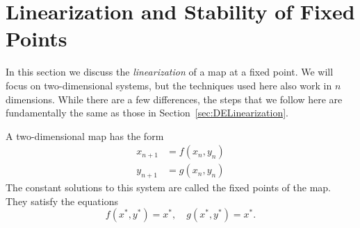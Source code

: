 \section{Linearization and Stability of Fixed Points}
%
In this section we discuss the \emph{linearization}
of a map at a fixed point. 
We will focus on two-dimensional systems, but the
techniques used here also work in $n$ dimensions.
While there are a few differences, the steps that
we follow here are fundamentally the same as those
in Section~\ref{sec:DELinearization}.

A two-dimensional map has the form
\begin{equation}
\begin{split}
  x_{n+1} & = f(x_n,y_n) \\
  y_{n+1} & = g(x_n,y_n)
\end{split}
\label{eqn:map}
\end{equation}
The constant solutions to this system are called the fixed points
of the map.
They satisfy the equations
\begin{equation}
    f(x^*,y^*) = x^*, \quad g(x^*,y^*) = x^*.
\end{equation}

